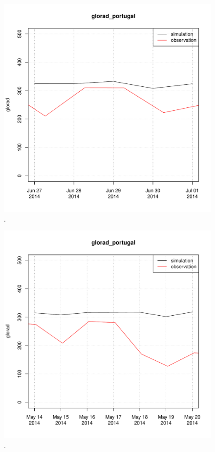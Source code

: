 \documentclass{scrreprt}
\begin{document}
\begin{figure}[ht]
  \centering
  \includegraphics[width=0.8\hsize]{./plot_glorad_compare_portugal_HS_2014-06-26_2014-07-01.pdf}
  \caption{.}
  \label{fig:portugal_HS_glorad1}
\end{figure}

\begin{figure}[ht]
  \centering
  \includegraphics[width=0.8\hsize]{./plot_glorad_compare_portugal_NSA_2014-05-13_2014-05-20.pdf}
  \caption{.}
  \label{fig:portugal_NSA_glorad1}
\end{figure}
\end{document}
